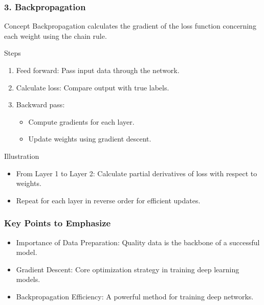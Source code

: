 \documentclass[aspectratio=169]{beamer}
\begin{document}
\begin{frame}[fragile]
    \frametitle{3. Backpropagation}
    \begin{block}{Concept}
        Backpropagation calculates the gradient of the loss function concerning each weight using the chain rule.
    \end{block}
    \begin{block}{Steps}
        \begin{enumerate}
            \item Feed forward: Pass input data through the network.
            \item Calculate loss: Compare output with true labels.
            \item Backward pass:
            \begin{itemize}
                \item Compute gradients for each layer.
                \item Update weights using gradient descent.
            \end{itemize}
        \end{enumerate}
    \end{block}
    \begin{block}{Illustration}
        \begin{itemize}
            \item From Layer 1 to Layer 2: Calculate partial derivatives of loss with respect to weights.
            \item Repeat for each layer in reverse order for efficient updates.
        \end{itemize}
    \end{block}
\end{frame}

\begin{frame}[fragile]
    \frametitle{Key Points to Emphasize}
    \begin{itemize}
        \item Importance of Data Preparation: Quality data is the backbone of a successful model.
        \item Gradient Descent: Core optimization strategy in training deep learning models.
        \item Backpropagation Efficiency: A powerful method for training deep networks.
    \end{itemize}
\end{frame}
\end{document}
